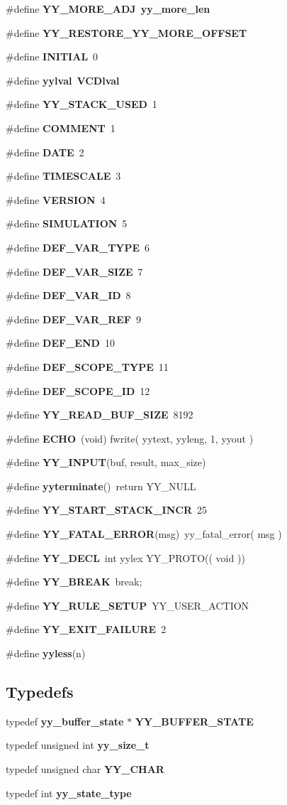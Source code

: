 \begin{CompactItemize}
\#define {\bf YY\_\-MORE\_\-ADJ}\ {\bf yy\_\-more\_\-len}
\item 
\#define {\bf YY\_\-RESTORE\_\-YY\_\-MORE\_\-OFFSET}
\item 
\#define {\bf INITIAL}\ 0
\item 
\#define {\bf yylval}\ {\bf VCDlval}
\item 
\#define {\bf YY\_\-STACK\_\-USED}\ 1
\item 
\#define {\bf COMMENT}\ 1
\item 
\#define {\bf DATE}\ 2
\item 
\#define {\bf TIMESCALE}\ 3
\item 
\#define {\bf VERSION}\ 4
\item 
\#define {\bf SIMULATION}\ 5
\item 
\#define {\bf DEF\_\-VAR\_\-TYPE}\ 6
\item 
\#define {\bf DEF\_\-VAR\_\-SIZE}\ 7
\item 
\#define {\bf DEF\_\-VAR\_\-ID}\ 8
\item 
\#define {\bf DEF\_\-VAR\_\-REF}\ 9
\item 
\#define {\bf DEF\_\-END}\ 10
\item 
\#define {\bf DEF\_\-SCOPE\_\-TYPE}\ 11
\item 
\#define {\bf DEF\_\-SCOPE\_\-ID}\ 12
\item 
\#define {\bf YY\_\-READ\_\-BUF\_\-SIZE}\ 8192
\item 
\#define {\bf ECHO}\ (void) fwrite( yytext, yyleng, 1, yyout )
\item 
\#define {\bf YY\_\-INPUT}(buf, result, max\_\-size)
\item 
\#define {\bf yyterminate}()\ return YY\_\-NULL
\item 
\#define {\bf YY\_\-START\_\-STACK\_\-INCR}\ 25
\item 
\#define {\bf YY\_\-FATAL\_\-ERROR}(msg)\ yy\_\-fatal\_\-error( msg )
\item 
\#define {\bf YY\_\-DECL}\ int yylex YY\_\-PROTO(( void ))
\item 
\#define {\bf YY\_\-BREAK}\ break;
\item 
\#define {\bf YY\_\-RULE\_\-SETUP}\ YY\_\-USER\_\-ACTION
\item 
\#define {\bf YY\_\-EXIT\_\-FAILURE}\ 2
\item 
\#define {\bf yyless}(n)
\end{CompactItemize}
\subsection*{Typedefs}
\begin{CompactItemize}
\item 
typedef {\bf yy\_\-buffer\_\-state} $\ast$ {\bf YY\_\-BUFFER\_\-STATE}
\item 
typedef unsigned int {\bf yy\_\-size\_\-t}
\item 
typedef unsigned char {\bf YY\_\-CHAR}
\item 
typedef int {\bf yy\_\-state\_\-type}
\end{CompactItemize}
